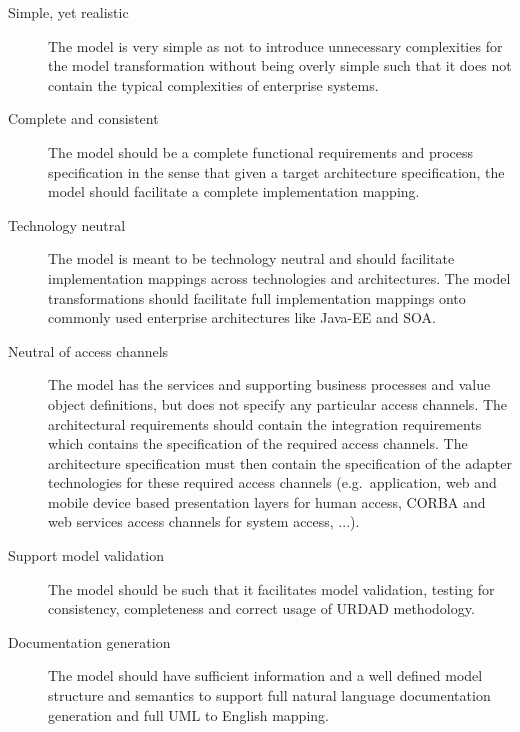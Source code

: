 \begin{description}
  \item[Simple, yet realistic] The model is very simple as not to introduce unnecessary complexities
		for the model transformation without being overly simple such that it does not contain the typical complexities
		of enterprise systems.

  \item[Complete and consistent] The model should be a complete functional requirements and process specification
in the sense that given a target architecture specification, the model should facilitate a complete implementation mapping.

  \item[Technology neutral] The model is meant to be technology neutral and should facilitate implementation
				mappings across technologies and architectures. The model transformations should facilitate full 
				implementation mappings onto commonly used enterprise architectures like Java-EE and SOA.

  \item[Neutral of access channels] The model has the services and supporting business processes and
	 value object definitions, but does not specify any particular access channels. The architectural requirements
	 should contain the integration requirements which contains the specification of the required access channels.
	 The architecture specification must then contain the specification of the adapter technologies for these required access 
	 channels (e.g.\ application, web and mobile device based presentation layers for human access, CORBA and web services access channels
	 for system access, ...).

  \item[Support model validation] The model should be such that it facilitates model validation, testing for consistency,
		completeness and correct usage of URDAD methodology.

  \item[Documentation generation] The model should have sufficient information and a well defined model structure
	 and semantics to support full natural language documentation generation and full UML to English mapping.
\end{description}
